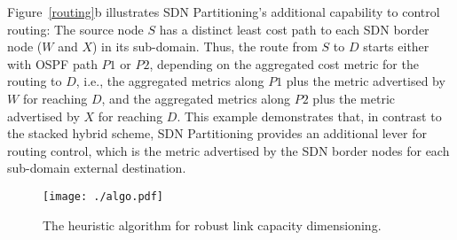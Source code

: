 \documentclass[10pt, conference]{IEEEtran}
\begin{document}
Figure~\ref{routing}b illustrates SDN Partitioning's additional capability to control routing: The source node $S$ has a distinct least cost path to each SDN border node ($W$ and $X$) in its sub-domain. Thus, the route from $S$ to $D$ starts either with OSPF path $P1$ or $P2$, depending on the aggregated cost metric for the routing to $D$, i.e., the aggregated metrics along $P1$ plus the metric advertised by $W$ for reaching $D$, and the aggregated metrics along $P2$ plus the metric advertised by $X$ for reaching $D$. This example demonstrates that, in contrast to the stacked hybrid scheme, SDN Partitioning provides an additional lever for routing control, which is the metric advertised by the SDN border nodes for each sub-domain external destination.

\begin{figure}[b!] \center
\texttt{[image: ./algo.pdf]}
\caption{The heuristic algorithm for robust link capacity dimensioning.}
\label{algo} \end{figure}
\end{document}
